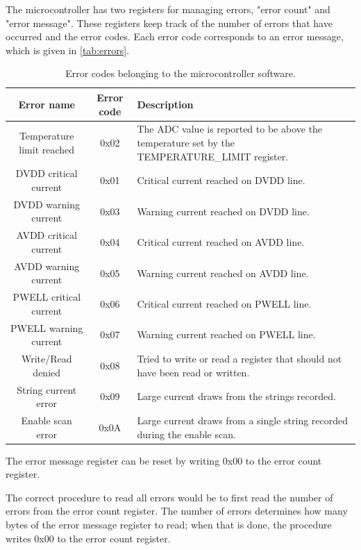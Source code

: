 \documentclass[main.tex]{subfiles}
\begin{document}
The microcontroller has two registers for managing errors, "error count" and "error message". These registers keep track of the number of errors that have occurred and the error codes. Each error code corresponds to an error message, which is given in \autoref{tab:errors}.
\begin{table}[h]

\centering

\begin{tabular}{||c c p{7.5cm} ||}
 \hline
 Error name & Error code & Description \\ [0.5ex] 
 \hline\hline
 Temperature limit reached & 0x02 & The ADC value is reported to be above
the temperature set by the TEMPERATURE\_LIMIT register. \\ 
 \hline
 DVDD critical current & 0x01 & Critical current reached on DVDD line. \\ 
 \hline
 DVDD warning current & 0x03 & Warning current reached on DVDD line. \\
 \hline
 AVDD critical current & 0x04 & Critical current reached on AVDD line. \\ 
 \hline
 AVDD warning current & 0x05 & Warning current reached on AVDD line. \\ 
 \hline
 PWELL critical current & 0x06 & Critical current reached on PWELL line. \\ 
 \hline
 PWELL warning current & 0x07 & Warning current reached on PWELL line. \\ 
 \hline
 Write/Read denied & 0x08 & Tried to write or read a register that should not have been read or written. \\ 
 \hline
String current error & 0x09 & Large current draws from the strings recorded.\\
 \hline
Enable scan error & 0x0A & Large current draws from a single string recorded during the enable scan.\\ [1ex] 
 \hline

\end{tabular}
\caption{Error codes belonging to the microcontroller software.}
\label{tab:errors}
\end{table}
\FloatBarrier

The error message register can be reset by writing 0x00 to the error count register.

The correct procedure to read all errors would be to first read the number of errors from the error count register. The number of errors determines how many bytes of the error message register to read; when that is done, the procedure writes 0x00 to the error count register.

\end{document}
